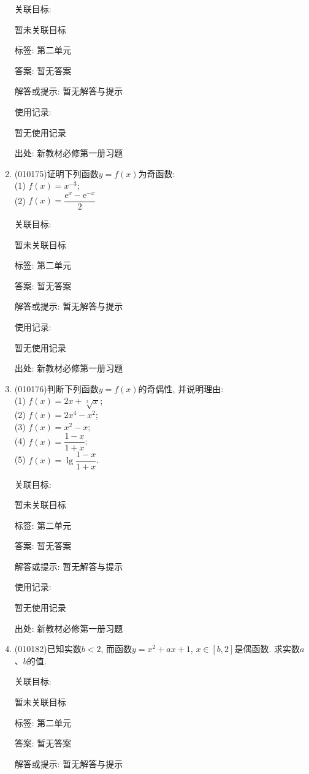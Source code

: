 \documentclass[10pt,a4paper]{article}
\begin{document}
\begin{enumerate}[1.]
关联目标:

暂未关联目标



标签: 第二单元

答案: 暂无答案

解答或提示: 暂无解答与提示

使用记录:

暂无使用记录


出处: 新教材必修第一册习题
\item { (010175)}证明下列函数$y=f(x)$为奇函数:\\
(1) $f(x)=x^{-3}$;\\
(2) $f(x)=\dfrac{\mathrm{e}^x-\mathrm{e}^{-x}}2$


关联目标:

暂未关联目标



标签: 第二单元

答案: 暂无答案

解答或提示: 暂无解答与提示

使用记录:

暂无使用记录


出处: 新教材必修第一册习题
\item { (010176)}判断下列函数$y=f(x)$的奇偶性, 并说明理由:\\
(1) $f(x)=2x+\sqrt[3]x$;\\
(2) $f(x)=2x^4-x^2$;\\
(3) $f(x)=x^2-x$;\\
(4) $f(x)=\dfrac{1-x}{1+x}$;\\
(5) $f(x)=\lg\dfrac {1-x}{1+x}$.


关联目标:

暂未关联目标



标签: 第二单元

答案: 暂无答案

解答或提示: 暂无解答与提示

使用记录:

暂无使用记录


出处: 新教材必修第一册习题
\item { (010182)}已知实数$b<2$, 而函数$y=x^2+ax+1$, $x\in [b, 2]$是偶函数. 求实数$a$、$b$的值.


关联目标:

暂未关联目标



标签: 第二单元

答案: 暂无答案

解答或提示: 暂无解答与提示


\end{enumerate}
\end{document}

